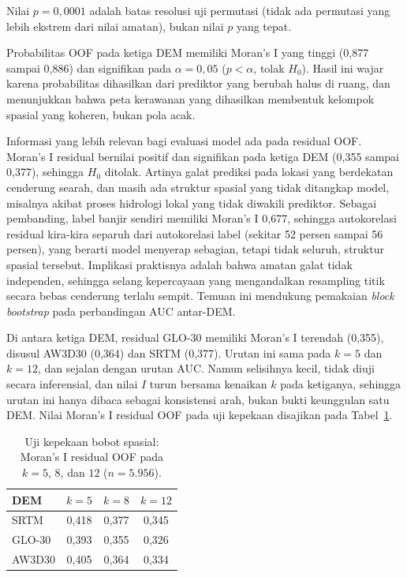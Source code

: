 \documentclass[12pt,a4paper]{article}
\begin{document}
Nilai $p=0{,}0001$ adalah batas resolusi uji permutasi (tidak ada permutasi
yang lebih ekstrem dari nilai amatan), bukan nilai $p$ yang tepat.

Probabilitas OOF pada ketiga DEM memiliki Moran's I yang tinggi (0,877 sampai
0,886) dan signifikan pada $\alpha=0{,}05$ ($p<\alpha$, tolak $H_0$). Hasil
ini wajar karena probabilitas dihasilkan dari prediktor yang berubah halus di
ruang, dan menunjukkan bahwa peta kerawanan yang dihasilkan membentuk
kelompok spasial yang koheren, bukan pola acak.

Informasi yang lebih relevan bagi evaluasi model ada pada residual OOF.
Moran's I residual bernilai positif dan signifikan pada ketiga DEM (0,355
sampai 0,377), sehingga $H_0$ ditolak. Artinya galat prediksi pada lokasi
yang berdekatan cenderung searah, dan masih ada struktur spasial yang tidak
ditangkap model, misalnya akibat proses hidrologi lokal yang tidak diwakili
prediktor. Sebagai pembanding, label banjir sendiri memiliki Moran's I 0,677,
sehingga autokorelasi residual kira-kira separuh dari autokorelasi label
(sekitar 52 persen sampai 56 persen), yang berarti model menyerap sebagian,
tetapi tidak seluruh, struktur spasial tersebut. Implikasi praktisnya adalah
bahwa amatan galat tidak independen, sehingga selang kepercayaan yang
mengandalkan resampling titik secara bebas cenderung terlalu sempit. Temuan
ini mendukung pemakaian \textit{block bootstrap} pada perbandingan AUC
antar-DEM.

Di antara ketiga DEM, residual GLO-30 memiliki Moran's I terendah (0,355),
disusul AW3D30 (0,364) dan SRTM (0,377). Urutan ini sama pada $k=5$ dan
$k=12$, dan sejalan dengan urutan AUC. Namun selisihnya kecil, tidak diuji
secara inferensial, dan nilai $I$ turun bersama kenaikan $k$ pada ketiganya,
sehingga urutan ini hanya dibaca sebagai konsistensi arah, bukan bukti
keunggulan satu DEM. Nilai Moran's I residual OOF pada uji kepekaan disajikan
pada Tabel~\ref{tab:moran-kek}.

\begin{table}[!htbp]
\small
\centering
\caption[Uji kepekaan bobot spasial Moran's I residual OOF]{Uji kepekaan bobot spasial: Moran's I residual OOF pada $k=5$, $8$,
dan $12$ ($n=5.956$).}
\label{tab:moran-kek}
\begin{tabular}{lccc}
\toprule
\textbf{DEM} & \textbf{$k=5$} & \textbf{$k=8$} & \textbf{$k=12$} \\
\midrule
SRTM   & 0,418 & 0,377 & 0,345 \\
GLO-30 & 0,393 & 0,355 & 0,326 \\
AW3D30 & 0,405 & 0,364 & 0,334 \\
\bottomrule
\end{tabular}
\end{table}
\end{document}
